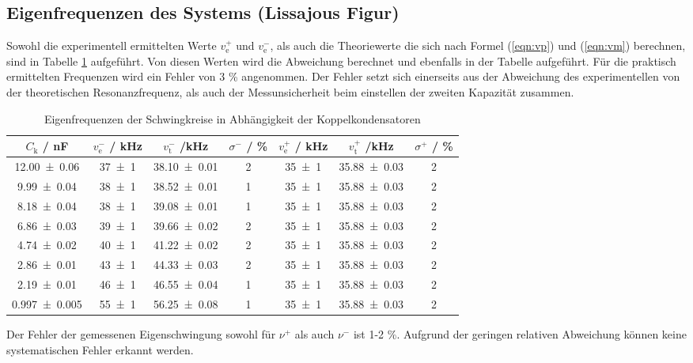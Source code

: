 \subsection{Eigenfrequenzen des Systems (Lissajous Figur)}
Sowohl die experimentell ermittelten Werte $v_\text{e}^+$ und  $v_\text{e}^-$, als auch die Theoriewerte die sich nach Formel (\ref{eqn:vp}) und (\ref{eqn:vm}) berechnen, sind in Tabelle \ref{tab:eigen} aufgeführt. Von diesen Werten wird die Abweichung berechnet und ebenfalls in der Tabelle aufgeführt. Für die praktisch ermittelten Frequenzen wird ein Fehler von 3 \% angenommen. Der Fehler setzt sich einerseits aus der Abweichung des experimentellen von der theoretischen Resonanzfrequenz, als auch der Messunsicherheit beim einstellen der zweiten Kapazität zusammen.
\begin{table}
  \centering
  \begin{tabular}{c c c c c c c}
    \toprule
    $C_\text{k}$ / nF & $v_\text{e}^-$ / kHz & $v_\text{t}^-$ /kHz & $\sigma^-$ / \% & $v_\text{e}^+$ / kHz & $v_\text{t}^+$ /kHz & $\sigma^+$ / \%  \\
    \midrule
    \num{12.00 +- 0.06}	& \num{37 +- 1}	& \num{38.10 +- 0.01} & 2 & \num{35 +- 1} & \num{35.88 +- 0.03} & 2 \\
    \num{9.99 +- 0.04}	& \num{38 +- 1}	& \num{38.52 +- 0.01} & 1 & \num{35 +- 1} & \num{35.88 +- 0.03} & 2 \\
    \num{8.18 +- 0.04}	& \num{38 +- 1} & \num{39.08 +- 0.01} & 1 & \num{35 +- 1} & \num{35.88 +- 0.03} & 2 \\
    \num{6.86 +- 0.03}	& \num{39 +- 1} & \num{39.66 +- 0.02} & 2 & \num{35 +- 1} & \num{35.88 +- 0.03} & 2 \\
    \num{4.74 +- 0.02}	& \num{40 +- 1} & \num{41.22 +- 0.02} & 2 & \num{35 +- 1} & \num{35.88 +- 0.03} & 2 \\
    \num{2.86 +- 0.01}	& \num{43 +- 1} & \num{44.33 +- 0.03} & 2 & \num{35 +- 1} & \num{35.88 +- 0.03} & 2 \\
    \num{2.19 +- 0.01}	& \num{46 +- 1} & \num{46.55 +- 0.04} & 1 & \num{35 +- 1} & \num{35.88 +- 0.03} & 2 \\
    \num{0.997 +- 0.005}& \num{55 +- 1} & \num{56.25 +- 0.08} & 1 & \num{35 +- 1} & \num{35.88 +- 0.03} & 2 \\
    \bottomrule
  \end{tabular}
  \caption{Eigenfrequenzen der Schwingkreise in Abhängigkeit der Koppelkondensatoren}
  \label{tab:eigen}
\end{table}
Der Fehler der gemessenen Eigenschwingung sowohl für $\nu^+$ als auch $\nu^-$ ist 1-2 \%. Aufgrund der geringen relativen Abweichung können keine systematischen Fehler erkannt werden.
